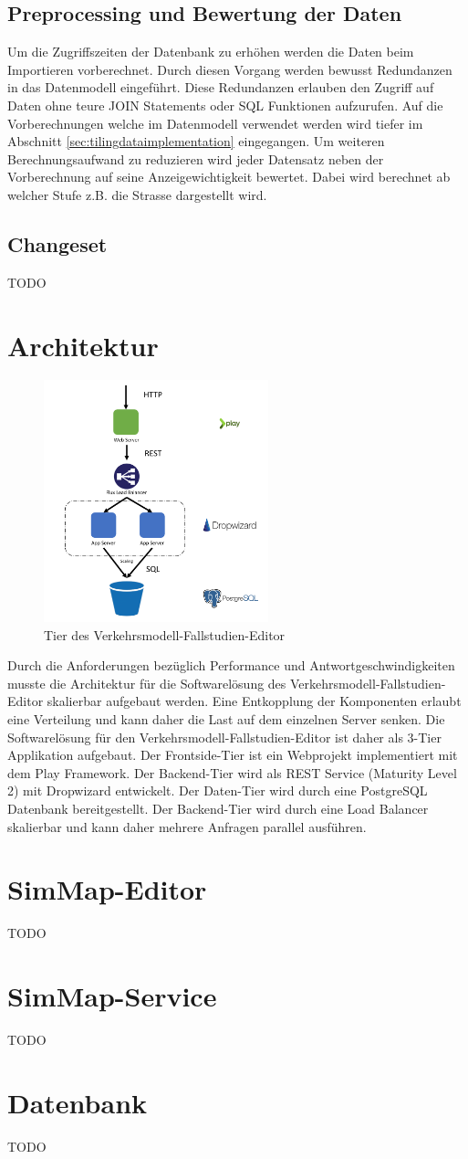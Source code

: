 \subsection{Preprocessing und Bewertung der Daten}\label{sec:concept_preprocessing}
Um die Zugriffszeiten der Datenbank zu erhöhen werden die Daten beim Importieren vorberechnet. Durch diesen Vorgang werden bewusst Redundanzen in das Datenmodell eingeführt. Diese Redundanzen erlauben den Zugriff auf Daten ohne teure JOIN Statements oder SQL Funktionen aufzurufen. Auf die Vorberechnungen welche im Datenmodell verwendet werden wird tiefer im Abschnitt \ref{sec:tilingdataimplementation}  eingegangen. Um weiteren Berechnungsaufwand zu reduzieren wird jeder Datensatz neben der Vorberechnung auf seine Anzeigewichtigkeit bewertet. Dabei wird berechnet ab welcher Stufe z.B. die Strasse dargestellt wird.

\subsection{Changeset}
TODO
\section{Architektur}
\begin{figure}[H]
\centering
\includegraphics[height=7cm]{images/Architektur.png}
\caption{Tier des Verkehrsmodell-Fallstudien-Editor}
\label{tier_architecture}
\end{figure}
Durch die Anforderungen bezüglich Performance und Antwortgeschwindigkeiten musste die Architektur für die Softwarelösung des Verkehrsmodell-Fallstudien-Editor skalierbar aufgebaut werden. Eine Entkopplung der Komponenten erlaubt eine Verteilung und kann daher die Last auf dem einzelnen Server senken. Die Softwarelösung für den Verkehrsmodell-Fallstudien-Editor ist daher als 3-Tier Applikation aufgebaut. Der Frontside-Tier ist ein Webprojekt implementiert mit dem Play Framework. Der Backend-Tier wird als REST Service (Maturity Level 2) mit Dropwizard entwickelt. Der Daten-Tier wird durch eine PostgreSQL Datenbank bereitgestellt. Der Backend-Tier wird durch eine Load Balancer skalierbar und kann daher mehrere Anfragen parallel ausführen.\\
\section{SimMap-Editor}
TODO
\section{SimMap-Service}
TODO
\section{Datenbank}
TODO